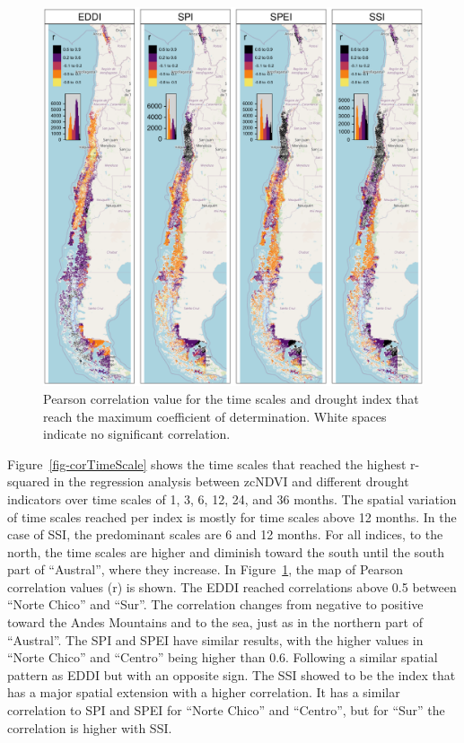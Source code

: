 \documentclass[
  authoryear,
  preprint,
  3p,
  onecolumn]{elsarticle}
\begin{document}
\begin{figure}[!ht]

{\centering \includegraphics{../output/figs/mapa_cor_r_indices_zcNDVI6.png}

}

\caption{\label{fig-corPerson}Pearson correlation value for the time
scales and drought index that reach the maximum coefficient of
determination. White spaces indicate no significant correlation.}

\end{figure}

Figure~\ref{fig-corTimeScale} shows the time scales that reached the
highest r-squared in the regression analysis between zcNDVI and
different drought indicators over time scales of 1, 3, 6, 12, 24, and 36
months. The spatial variation of time scales reached per index is mostly
for time scales above 12 months. In the case of SSI, the predominant
scales are 6 and 12 months. For all indices, to the north, the time
scales are higher and diminish toward the south until the south part of
``Austral'', where they increase. In Figure~\ref{fig-corPerson}, the map
of Pearson correlation values (r) is shown. The EDDI reached
correlations above 0.5 between ``Norte Chico'' and ``Sur''. The
correlation changes from negative to positive toward the Andes Mountains
and to the sea, just as in the northern part of ``Austral''. The SPI and
SPEI have similar results, with the higher values in ``Norte Chico'' and
``Centro'' being higher than 0.6. Following a similar spatial pattern as
EDDI but with an opposite sign. The SSI showed to be the index that has
a major spatial extension with a higher correlation. It has a similar
correlation to SPI and SPEI for ``Norte Chico'' and ``Centro'', but for
``Sur'' the correlation is higher with SSI.
\end{document}
